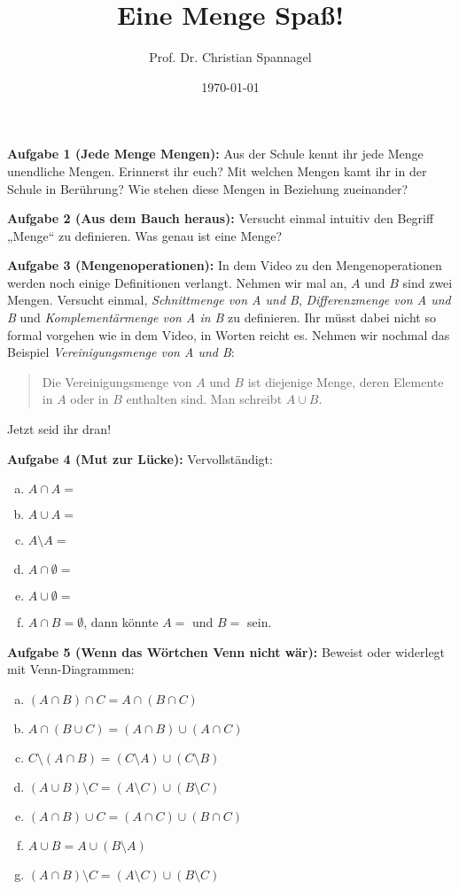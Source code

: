 \documentclass{../cssheet}
\title{Eine Menge Spaß!}
\author{Prof. Dr. Christian Spannagel}
\date{\today}
\begin{document}
\printtitle

\vspace*{10mm}

\textbf{Aufgabe 1 (Jede Menge Mengen):}  Aus der Schule kennt ihr jede Menge unendliche
Mengen. Erinnerst ihr euch? Mit welchen Mengen kamt ihr in der Schule in Berührung? Wie
stehen diese Mengen in Beziehung zueinander?

\textbf{Aufgabe 2 (Aus dem Bauch heraus):} Versucht einmal intuitiv den Begriff „Menge“ zu
definieren. Was genau ist eine Menge?

\textbf{Aufgabe 3 (Mengenoperationen):}  In dem Video zu den Mengenoperationen werden noch
einige Definitionen verlangt. Nehmen wir mal an, $A$ und $B$ sind zwei Mengen. Versucht
einmal, \emph{Schnittmenge von A und B}, \emph{Differenzmenge von A und B} und
\emph{Komplementärmenge von A in B} zu definieren. Ihr müsst dabei nicht so formal vorgehen
wie in dem Video, in Worten reicht es. Nehmen wir nochmal das Beispiel
\emph{Vereinigungsmenge von A und B}:

\begin{quote}
Die Vereinigungsmenge von $A$ und $B$ ist diejenige Menge, deren Elemente in $A$ oder in $B$ enthalten sind. Man schreibt $A \cup B$.
\end{quote}

Jetzt seid ihr dran!
 
\textbf{Aufgabe 4 (Mut zur Lücke):}  
Vervollständigt:

\begin{enumerate}[a)]
\item $A \cap A = $
\item $A \cup A = $
\item $A\setminus A = $
\item $A\cap \emptyset =$
\item $A\cup \emptyset =$
\item $A\cap B = \emptyset$, dann könnte $A=$ \hspace{1cm} und $B=$ \hspace{1cm} sein.
\end{enumerate}

\textbf{Aufgabe 5 (Wenn das Wörtchen Venn nicht wär):}  
Beweist oder widerlegt mit Venn-Diagrammen:
\begin{enumerate}[a)]
\item $(A \cap B) \cap C = A \cap (B \cap C)$
\item $A \cap (B \cup C) = (A \cap B) \cup (A \cap  C)$
\item $C\setminus (A\cap B) = (C\setminus A) \cup (C\setminus B)$
\item $(A\cup B)\setminus C = (A\setminus C) \cup (B\setminus C)$
\item $(A\cap B)\cup C = (A\cap C) \cup (B\cap C)$
\item $A\cup B = A \cup (B\setminus A)$
\item $(A\cap B)\setminus C = (A\setminus C) \cup (B\setminus C)$
\end{enumerate}
\end{document}
